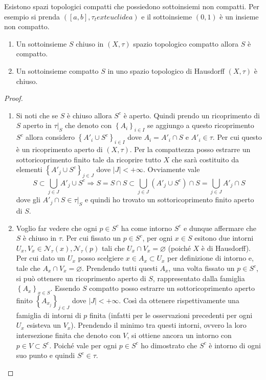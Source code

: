 \begin{remark}
	Esistono spazi topologici compatti che possiedono sottoinsiemi non compatti. Per esempio si prenda $(\left[a, b\right],\tau_text{euclidea})$ e il sottoinsieme $(0, 1)$ è un insieme non compatto. 
\end{remark} 

\begin{theorem}
	\begin{enumerate}
		\item Un sottoinsieme $S$ chiuso in $(X, \tau)$ spazio topologico compatto allora $S$ è compatto. 
		\item Un sottoinsieme compatto $S$ in uno spazio topologico di Hausdorff $(X,\tau)$ è chiuso. 
	\end{enumerate}
\end{theorem} 
\begin{proof}
	\begin{enumerate}
		\item Si noti che se $S$ è chiuso allora $S^c$ è aperto. Quindi prendo un ricoprimento di $S$ aperto in $\tau|_S$ che denoto con $\left\{A_i\right\}_{i \in I}$ se aggiungo a questo ricoprimento $S^c$ allora considero $\left\{A'_i \cup S^c\right\}_{i \in I}$ dove $A_i = A'_i \cap S$ e $A'_i \in \tau$. Per cui questo è un ricoprimento aperto di $(X,\tau)$. Per la compattezza posso estrarre un sottoricoprimento finito tale da ricoprire tutto $X$ che sarà costituito da elementi $\left\{A'_j \cup S^c\right\}_{j \in J}$ dove $|J| < +\infty$. Ovviamente vale
		\begin{equation*}
			S \subset \bigcup_{j \in J} A'_j \cup S^c \Longrightarrow S = S \cap S \subset \bigcup_{j \in J} (A'_j \cup S^c) \cap S = \bigcup_{j \in J} A'_j  \cap S
		\end{equation*}
		dove gli $A'_j \cap S \in \tau|_S$ e quindi ho trovato un sottoricoprimento finito aperto di $S$.  
		\item 
		Voglio far vedere che ogni $p \in S^c$ ha come intorno $S^c$ e dunque affermare che $S$ è chiuso in $\tau$. Per cui fissato un $p \in S^c$, per ogni $x \in S$ esitono due intorni $U_x, V_x \in \mathcal{N}_\tau(x), \mathcal{N}_\tau(p)$ tali che $U_x \cap V_x = \varnothing$ (poiché $X$ è di Hausdorff). Per cui dato un $U_x$ posso scelgiere $x \in A_x \subset U_x$ per definizione di intorno e, tale che $A_x \cap V_x = \varnothing$. Prendendo tutti questi $A_x$, una volta fissato un $p \in S^c$, si può ottenere un ricoprimento aperto di $S$, rappresentato dalla famiglia $\left\{A_x\right\}_{x \in S}$. Essendo $S$ compatto posso estrarre un sottoricoprimento aperto finito  $\left\{A_{x_j}\right\}_{j \in J}$ dove $|J| < +\infty$. Così da ottenere rispettivamente una famiglia di intorni di $p$ finita (infatti per le osservazioni precedenti per ogni $U_x$ esisteva un $V_x$). Prendendo il minimo tra questi intorni, ovvero la loro intersezione finita che denoto con $V$, si ottiene ancora un intorno con $p \in V \subset S^c$. Poiché vale per ogni $p \in S^c$ ho dimostrato che $S^c$ è intorno di ogni suo punto e quindi $S^c \in \tau$. 
	\end{enumerate}
\end{proof}

